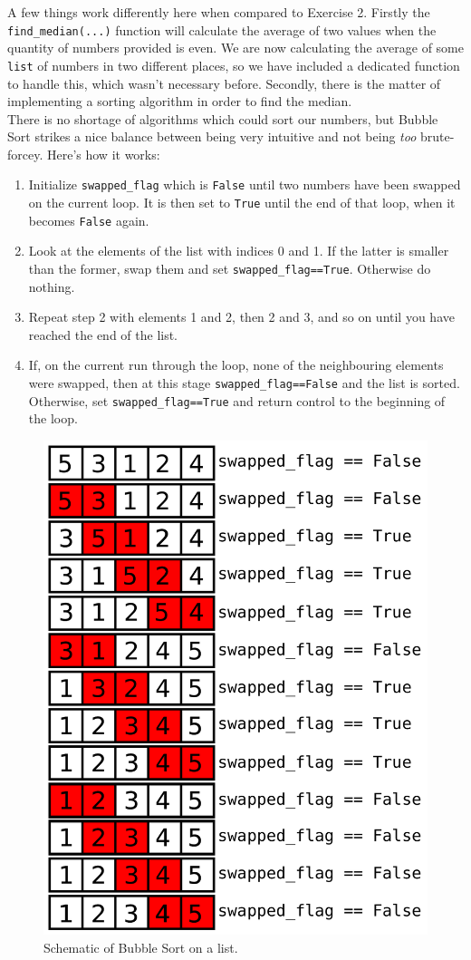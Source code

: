 \documentclass{report}
\begin{document}
A few things work differently here when compared to Exercise 2. Firstly the \verb|find_median(...)| function will calculate the average of two values when the quantity of numbers provided is even. We are now calculating the average of some \verb|list| of numbers in two different places, so we have included a dedicated function to handle this, which wasn't necessary before. Secondly, there is the matter of implementing a sorting algorithm in order to find the median.\\
\indent There is no shortage of algorithms which could sort our numbers, but Bubble Sort strikes a nice balance between being very intuitive and not being \textit{too} brute-forcey. Here's how it works:
\vspace{8px}
\begin{enumerate}
\item Initialize \verb|swapped_flag| which is \verb|False| until two numbers have been swapped on the current loop. It is then set to \verb|True| until the end of that loop, when it becomes \verb|False| again.
\item Look at the elements of the list with indices 0 and 1. If the latter is smaller than the former, swap them and set \verb|swapped_flag==True|. Otherwise do nothing.
\item Repeat step 2 with elements 1 and 2, then 2 and 3, and so on until you have reached the end of the list.
\item If, on the current run through the loop, none of the neighbouring elements were swapped, then at this stage \verb|swapped_flag==False| and the list is sorted. Otherwise, set \verb|swapped_flag==True| and return control to the beginning of the loop.
\end{enumerate}
\begin{figure}[t]
\centering
\includegraphics[width=0.8\linewidth]{Graphics/bubble_sort.pdf}
\caption{Schematic of Bubble Sort on a list.}
\label{fig_bubble_sort}
\end{figure}
\end{document}
